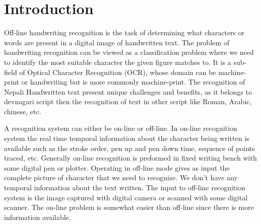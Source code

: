 \documentclass[12pt,a4paper,oneside]{article}
\numberwithin{equation}{section}
\numberwithin{algorithm}{section}
\begin{document}
%

\pagestyle{plain}

\section{Introduction} \label{introduction}
Off-line handwriting recognition is the task of determining what characters or words are present in a digital image of handwritten text. The problem of handwriting recognition can be viewed as a classification problem where we need to identify the most suitable character the given figure matches to. It is a sub-field of Optical Character Recognition (OCR), whose domain can be machine-print or handwriting but is more commonly machine-print. The recognition of Nepali Handwritten text present unique challenges and benefits, as it belongs to devnagari script then the recognition of text in other script like Roman, Arabic, chinese, etc.

A recognition system can either be on-line or off-line. In on-line recognition system the real time temporal information about the character being written is available such as the stroke order, pen up and pen down time, sequence of points traced, etc. Generally on-line recognition is preformed in fixed writing bench with some digital pen or plotter.  Operating in off-line mode gives as input the complete picture of character that we need to recognize. We don't have any temporal information about the text written. The input to off-line recognition system is the image captured with digital camera or scanned with some digital scanner. The on-line problem is somewhat easier than off-line since there is more information available.
\end{document}
